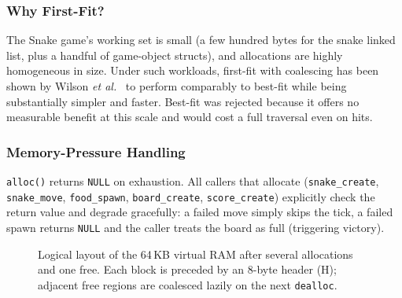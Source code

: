 \documentclass[conference]{IEEEtran}
\begin{document}
\subsubsection{Why First-Fit?}
The Snake game's working set is small (a few hundred bytes for the snake linked list, plus a handful of game-object structs), and allocations are highly homogeneous in size. Under such workloads, first-fit with coalescing has been shown by Wilson \emph{et al.}~\cite{wilson1995} to perform comparably to best-fit while being substantially simpler and faster. Best-fit was rejected because it offers no measurable benefit at this scale and would cost a full traversal even on hits.

\subsubsection{Memory-Pressure Handling}
\texttt{alloc()} returns \texttt{NULL} on exhaustion. All callers that allocate (\texttt{snake\_create}, \texttt{snake\_move}, \texttt{food\_spawn}, \texttt{board\_create}, \texttt{score\_create}) explicitly check the return value and degrade gracefully: a failed move simply skips the tick, a failed spawn returns \texttt{NULL} and the caller treats the board as full (triggering victory).

\begin{figure}[H]
    \centering
    \caption{Logical layout of the 64\,KB virtual RAM after several allocations and one free. Each block is preceded by an 8-byte header (\textsc{H}); adjacent free regions are coalesced lazily on the next \texttt{dealloc}.}
    \label{fig:mem}
\end{figure}
\end{document}
